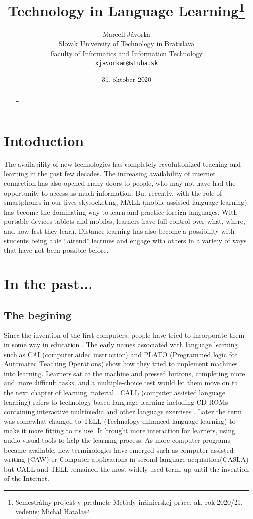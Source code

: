 \documentclass[10pt,english,a4paper]{article}
\title{Technology in Language Learning\thanks{Semestrálny projekt v predmete Metódy inžinierskej práce, ak. rok 2020/21, vedenie: Michal Hatala}} %
\author{Marcell Jávorka\\[2pt]
	{\small Slovak University of Technology in Bratislava}\\
	{\small Faculty of Informatics and Information Technology}\\
	{\small \texttt{xjavorkam@stuba.sk}}
	}
\date{\small 31. oktober 2020} %
\begin{document}
\maketitle

\begin{abstract}
\ldots
\end{abstract}



\section{Intoduction}

The availability of new technologies has completely revolutionized teaching and learning in the past few decades. The increasing availability of internet connection has also opened many doors to people, who may not have had the opportunity to access as much information. But recently, with the role of smartphones in our lives skyrocketing, MALL (mobile-assisted language learning) has become the dominating way to learn and practice foreign languages. With portable devices tablets and mobiles, learners have full control over what, where, and how fast they learn. Distance learning has also become a possibility with students being able “attend” lectures and engage with others in a variety of ways that have not been possible before.


\section{In the past...} 


\subsection{The begining}
Since the invention of the first computers, people have tried to incorporate them in some way in education \cite {john2018evolution}. The early names associated with language learning such as CAI (computer aided instruction) and PLATO (Programmed logic for Automated Teaching Operations) show how they tried to implement machines into learning. Learners sat at the machine and pressed buttons, completing more and more difficult tasks, and a multiple-choice test would let them move on to the next chapter of learning material \cite {farr2016routledge}. CALL (computer assisted language learning) refers to technology-based language learning including CD-ROMs containing interactive multimedia and other language exercises \cite {chapelle2010spread}. Later the term was somewhat changed to TELL (Technology-enhanced language learning) to make it more fitting to its use. It brought more interaction for learners, using audio-visual tools to help the learning process. As more computer programs became available, new terminologies have emerged such as computer-assisted writing (CAW) or Computer applications in second language acquisition(CASLA) but CALL and TELL remained the most widely used term\cite {farr2016routledge}, up until the invention of the Internet.
\end{document}
